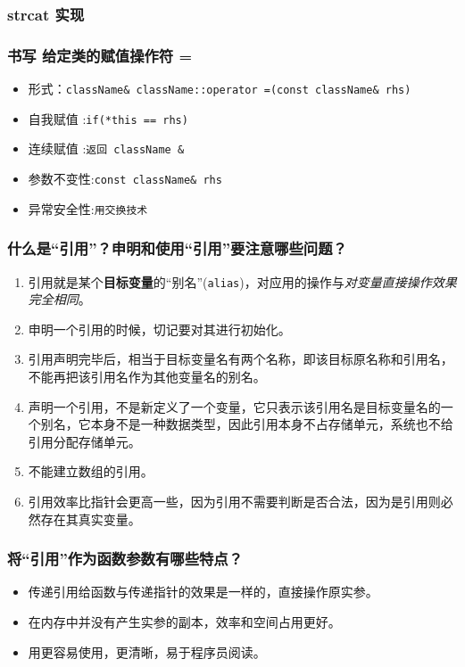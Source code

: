 \documentclass[UTF8,a4paper,8pt]{ctexart}
\begin{document}
		\subsubsection{strcat 实现}
		
		\subsubsection{书写 给定类的赋值操作符 = }
			\begin{itemize}[itemindent = 1em]
				\item 形式：\verb|className& className::operator =(const className& rhs)|
				\item 自我赋值	:\verb|if(*this == rhs)|
				\item 连续赋值	:\verb|返回 className &|
				\item 参数不变性:\verb|const className& rhs|
				\item 异常安全性:\verb|用交换技术|
			\end{itemize}
			
		\subsubsection{什么是“引用”？申明和使用“引用”要注意哪些问题？}
			\begin{enumerate}[itemindent = 1em]
				\item 引用就是某个\textbf{目标变量}的“别名”(\verb|alias|)，对应用的操作与\textit{对变量直接操作效果完全相同}。
				
				\item 申明一个引用的时候，切记要对其进行初始化。
				
				\item 引用声明完毕后，相当于目标变量名有两个名称，即该目标原名称和引用名，不能再把该引用名作为其他变量名的别名。
				
				\item 声明一个引用，不是新定义了一个变量，它只表示该引用名是目标变量名的一个别名，它本身不是一种数据类型，因此引用本身不占存储单元，系统也不给引用分配存储单元。
				
				\item 不能建立数组的引用。
				
				\item 引用效率比指针会更高一些，因为引用不需要判断是否合法，因为是引用则必然存在其真实变量。
			\end{enumerate}
		\subsubsection{将“引用”作为函数参数有哪些特点？}
			\begin{itemize}[itemindent = 1em]
				\item 传递引用给函数与传递指针的效果是一样的，直接操作原实参。
				\item 在内存中并没有产生实参的副本，效率和空间占用更好。
				\item 用更容易使用，更清晰，易于程序员阅读。
			\end{itemize}
\end{document}
